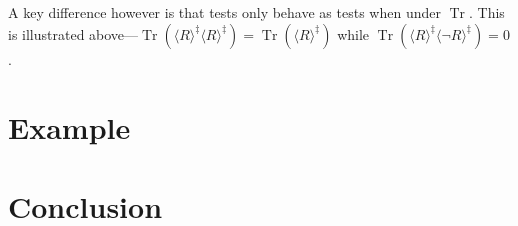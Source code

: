 \documentclass{llncs}
\DeclareMathOperator{\tr}{Tr}
\begin{document}
A key difference however is that tests only behave as tests when under
$\tr$. This is illustrated above---$\tr(\langle R\rangle^\ddagger\langle
R\rangle^\ddagger) = \tr(\langle R\rangle^\ddagger)$ while $\tr(\langle
R\rangle^\ddagger\langle \lnot R\rangle^\ddagger) = 0$.

\newpage
\section{Example}

\newpage
\section{Conclusion}

{}

\end{document}

